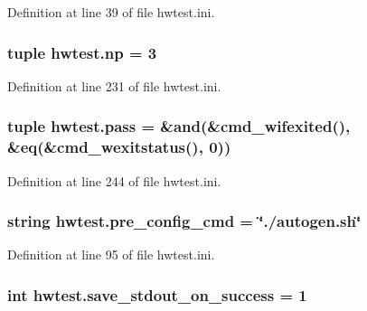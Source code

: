 Definition at line 39 of file hwtest.\-ini.

\hypertarget{namespacehwtest_a91f9231befdd013bc572920c4f6320ff}{
\subsubsection[{np}]{\setlength{\rightskip}{0pt plus 5cm}tuple hwtest.\-np = 3}}\label{namespacehwtest_a91f9231befdd013bc572920c4f6320ff}


Definition at line 231 of file hwtest.\-ini.

\hypertarget{namespacehwtest_aba9f32241019e8b74b8155d5fe25a326}{
\subsubsection[{pass}]{\setlength{\rightskip}{0pt plus 5cm}tuple hwtest.\-pass = \&and(\&cmd\-\_\-wifexited(), \&eq(\&cmd\-\_\-wexitstatus(), 0))}}\label{namespacehwtest_aba9f32241019e8b74b8155d5fe25a326}


Definition at line 244 of file hwtest.\-ini.

\hypertarget{namespacehwtest_a0b55d030449a5be7b3f9946712208ee4}{
\subsubsection[{pre\-\_\-config\-\_\-cmd}]{\setlength{\rightskip}{0pt plus 5cm}string hwtest.\-pre\-\_\-config\-\_\-cmd = \char`\"{}./autogen.\-sh\char`\"{}}}\label{namespacehwtest_a0b55d030449a5be7b3f9946712208ee4}


Definition at line 95 of file hwtest.\-ini.

\hypertarget{namespacehwtest_afffd8e55c08b72fb88423c7446b90d70}{
\subsubsection[{save\-\_\-stdout\-\_\-on\-\_\-success}]{\setlength{\rightskip}{0pt plus 5cm}int hwtest.\-save\-\_\-stdout\-\_\-on\-\_\-success = 1}}\label{namespacehwtest_afffd8e55c08b72fb88423c7446b90d70}


